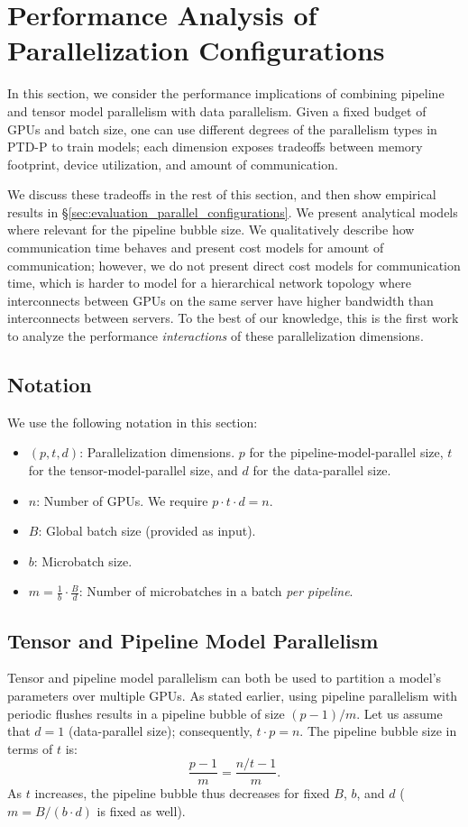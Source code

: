\section{Performance Analysis of Parallelization Configurations}
\label{sec:parallelization_dimensions}

In this section, we consider the performance implications of combining pipeline and tensor model parallelism with data parallelism. Given a fixed budget of GPUs and batch size, one can use different degrees of the parallelism types in PTD-P to train models; each dimension exposes tradeoffs between memory footprint, device utilization, and amount of communication.

We discuss these tradeoffs in the rest of this section, and then show empirical results in \S\ref{sec:evaluation_parallel_configurations}. We present analytical models where relevant for the pipeline bubble size. We qualitatively describe how communication time behaves and present cost models for amount of communication; however, we do not present direct cost models for communication time, which is harder to model for a hierarchical network topology where interconnects between GPUs on the same server have higher bandwidth than interconnects between servers. To the best of our knowledge, this is the first work to analyze the performance \emph{interactions} of these parallelization dimensions.

\subsection{Notation}
We use the following notation in this section:
\begin{itemize}
    \item $(p, t, d)$: Parallelization dimensions. $p$ for the pipeline-model-parallel size, $t$ for the tensor-model-parallel size, and $d$ for the data-parallel size.
    \item $n$: Number of GPUs. We require $p \cdot t \cdot d = n$.
    \item $B$: Global batch size (provided as input).
    \item $b$: Microbatch size.
    \item $m=\frac{1}{b}\cdot\frac{B}{d}$: Number of microbatches in a batch \emph{per pipeline}.
\end{itemize}

\subsection{Tensor and Pipeline Model Parallelism}
Tensor and pipeline model parallelism can both be used to partition a model's parameters over multiple GPUs. As stated earlier, using pipeline parallelism with periodic flushes results in a pipeline bubble of size $(p-1) / m$. Let us assume that $d=1$ (data-parallel size); consequently, $t \cdot p = n$. The pipeline bubble size in terms of $t$ is:
$$\frac{p-1}{m} = \frac{n/t-1}{m}.$$
As $t$ increases, the pipeline bubble thus decreases for fixed $B$, $b$, and $d$ ($m = B / (b \cdot d)$ is fixed as well).

